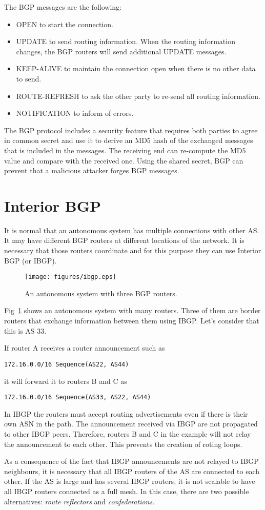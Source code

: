 The BGP messages are the following:
\begin{itemize}
\item OPEN to start the connection.
\item UPDATE to send routing information. When the routing information changes, the BGP routers will send additional UPDATE messages.
\item KEEP-ALIVE to maintain the connection open when there is no other data to send.
\item ROUTE-REFRESH to ask the other party to re-send all routing information.
\item NOTIFICATION to inform of errors.
\end{itemize}

The BGP protocol includes a security feature that requires both parties to agree in common secret and use it to derive an MD5 hash of the exchanged messages that is included in the messages.
The receiving end can re-compute the MD5 value and compare with the received one.
Using the shared secret, BGP can prevent that a malicious attacker forges BGP messages.

\section{Interior BGP}

It is normal that an autonomous system has multiple connections with other AS.
It may have different BGP routers at different locations of the network.
It is necessary that those routers coordinate and for this purpose they can use Interior BGP (or IBGP).


\begin{figure}[!h]
\centering
\texttt{[image: figures/ibgp.eps]}
\caption{An autonomous system with three BGP routers.}
\label{fig:ibgp}
\end{figure}

Fig~\ref{fig:ibgp} shows an autonomous system with many routers. 
Three of them are border routers that exchange information between them using IBGP.
Let's consider that this is AS 33.

If router A receives a router announcement such as 

\texttt{172.16.0.0/16 Sequence(AS22, AS44)}

it will forward it to routers B and C as 

\texttt{172.16.0.0/16 Sequence(AS33, AS22, AS44)}

In IBGP the routers must accept routing advertisements even if there is their own ASN in the path.
The announcement received via IBGP are not propagated to other IBGP peers.
Therefore, routers B and C in the example will not relay the announcement to each other.
This prevents the creation of roting loops.

As a consequence of the fact that IBGP announcements are not relayed to IBGP neighbours, it is necessary that all IBGP routers of the AS are connected to each other.
If the AS is large and has several IBGP routers, it is not scalable to have all IBGP routers connected as a full mesh.
In this case, there are two possible alternatives: \emph{route reflectors} and \emph{confederations}.


